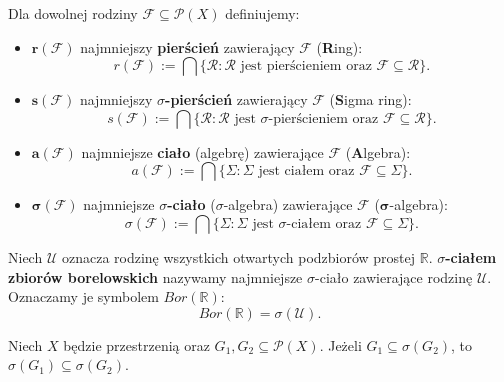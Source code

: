 Dla dowolnej rodziny $\mathcal{F} \subseteq \mathcal{P}(X)$ definiujemy:
    \begin{itemize}
        \item $\bm{r(\mathcal{F})}$  najmniejszy \textbf{pierścień} zawierający $\mathcal{F}$ (\textbf{R}ing):
		\[
		r\left( \mathcal{F} \right) := \bigcap \{\mathcal{R}: \mathcal{R}\text{ jest pierścieniem oraz }\mathcal{F}\subseteq \mathcal{R}\}  
		.\] 
        \item $\bm{s(\mathcal{F})}$ najmniejszy \textbf{$\sigma$-pierścień} zawierający $\mathcal{F}$ (\textbf{S}igma ring):
		\[
			s\left( \mathcal{F} \right) := \bigcap \{\mathcal{R}: \mathcal{R}\text{ jest $\sigma$-pierścieniem oraz }\mathcal{F}\subseteq \mathcal{R}\} 
		.\] 
        \item $\bm{a(\mathcal{F})}$  najmniejsze \textbf{ciało} (algebrę) zawierające $\mathcal{F}$ (\textbf{A}lgebra):
		\[
		a\left( \mathcal{F} \right) := \bigcap \{\Sigma : \Sigma \text{ jest ciałem oraz }\mathcal{F}\subseteq \Sigma \}
		.\] 
	\item $\bm{\sigma(\mathcal{F})}$  najmniejsze \textbf{$\sigma$-ciało} ($\sigma$-algebra) zawierające $\mathcal{F}$ ($\bm{\sigma}$-algebra):
		\[
		\sigma\left( \mathcal{F} \right) := \bigcap \{\Sigma : \Sigma \text{ jest $\sigma$-ciałem oraz }\mathcal{F}\subseteq \Sigma \}
		.\] 
    \end{itemize}

    \begin{definition}
    Niech $\mathcal{U}$ oznacza rodzinę wszystkich otwartych podzbiorów prostej $\mathbb{R}$.
    \textbf{$\sigma$-ciałem zbiorów borelowskich} nazywamy najmniejsze $\sigma$-ciało zawierające rodzinę $\mathcal{U}$. Oznaczamy je symbolem $Bor(\mathbb{R})$:
    \[
        Bor(\mathbb{R}) = \sigma(\mathcal{U}).
    \]
\end{definition}
\begin{lemma}
    Niech $X$ będzie przestrzenią oraz $G_1, G_2 \subseteq \mathcal{P}(X)$. 
    Jeżeli $G_1 \subseteq \sigma(G_2)$, to $\sigma(G_1) \subseteq \sigma(G_2)$.
\end{lemma}

